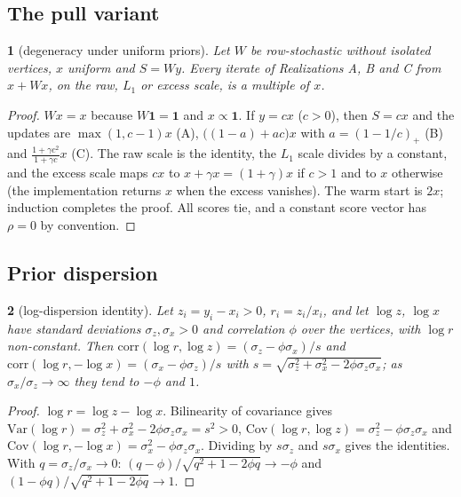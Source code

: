 \documentclass[11pt,a4paper]{article}
\theoremstyle{definition}
\theoremstyle{plain}
\newcommand{\genpropname}{}
\newtheorem*{genprop}{\genpropname}
\newenvironment{prop}[1]{\renewcommand{\genpropname}{Proposition #1}\begin{genprop}}{\end{genprop}}
\newcommand{\one}{\mathbf{1}}
\begin{document}
\subsection{The pull variant}

\begin{prop}{F}[degeneracy under uniform priors]
Let $W$ be row-stochastic without isolated vertices, $x$ uniform and $S=Wy$. Every iterate of Realizations A, B and C from $x+Wx$, on the raw, $L_1$ or excess scale, is a multiple of $x$.
\end{prop}

\begin{proof}
$Wx=x$ because $W\one=\one$ and $x\propto\one$. If $y=cx$ ($c>0$), then $S=cx$ and the updates are $\max(1,c-1)x$ (A), $\big((1-a)+ac\big)x$ with $a=(1-1/c)_+$ (B) and $\frac{1+\gamma c^2}{1+\gamma c}x$ (C). The raw scale is the identity, the $L_1$ scale divides by a constant, and the excess scale maps $cx$ to $x+\gamma x=(1+\gamma)x$ if $c>1$ and to $x$ otherwise (the implementation returns $x$ when the excess vanishes). The warm start is $2x$; induction completes the proof. All scores tie, and a constant score vector has $\rho=0$ by convention.
\end{proof}

\subsection{Prior dispersion}

\begin{prop}{$2'$}[log-dispersion identity]
Let $z_i=y_i-x_i>0$, $r_i=z_i/x_i$, and let $\log z$, $\log x$ have standard deviations $\sigma_z,\sigma_x>0$ and correlation $\phi$ over the vertices, with $\log r$ non-constant. Then $\mathrm{corr}(\log r,\log z)=(\sigma_z-\phi\sigma_x)/s$ and $\mathrm{corr}(\log r,-\log x)=(\sigma_x-\phi\sigma_z)/s$ with $s=\sqrt{\sigma_z^2+\sigma_x^2-2\phi\sigma_z\sigma_x}$; as $\sigma_x/\sigma_z\to\infty$ they tend to $-\phi$ and $1$.
\end{prop}

\begin{proof}
$\log r=\log z-\log x$. Bilinearity of covariance gives $\mathrm{Var}(\log r)=\sigma_z^2+\sigma_x^2-2\phi\sigma_z\sigma_x=s^2>0$, $\mathrm{Cov}(\log r,\log z)=\sigma_z^2-\phi\sigma_z\sigma_x$ and $\mathrm{Cov}(\log r,-\log x)=\sigma_x^2-\phi\sigma_z\sigma_x$. Dividing by $s\sigma_z$ and $s\sigma_x$ gives the identities. With $q=\sigma_z/\sigma_x\to0$: $(q-\phi)/\sqrt{q^2+1-2\phi q}\to-\phi$ and $(1-\phi q)/\sqrt{q^2+1-2\phi q}\to1$.
\end{proof}
\end{document}
